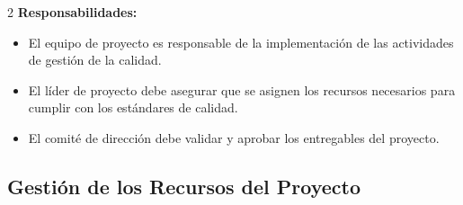 \begin{multicols}{2}
\textbf{Responsabilidades:}
\begin{itemize}
    \item El equipo de proyecto es responsable de la implementación de las actividades de gestión de la calidad.
    \item El líder de proyecto debe asegurar que se asignen los recursos necesarios para cumplir con los estándares de calidad.
    \item El comité de dirección debe validar y aprobar los entregables del proyecto.
\end{itemize}
      \end{multicols}

      \subsection{Gestión de los Recursos del Proyecto}

